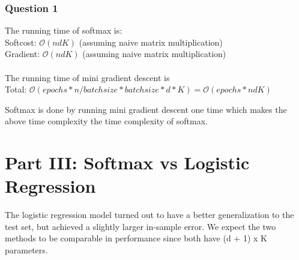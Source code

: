 \documentclass[paper=a4, fontsize=11pt]{scrartcl} %
\numberwithin{equation}{section} %
\numberwithin{figure}{section} %
\numberwithin{table}{section} %
\begin{document}
\subsubsection{Question 1}

The running time of softmax is: \\ 
Softcost: $\mathcal{O}(ndK)$ (assuming naive matrix multiplication) \\
Gradient: $\mathcal{O}(ndK)$ (assuming naive matrix multiplication) \\
\\
The running time of mini gradient descent is \\
Total: $\mathcal{O}(epochs * n/batchsize * batchsize * d * K) = \mathcal{O}(epochs * ndK)$

Softmax is done by running mini gradient descent one time which makes the above time complexity the time complexity of softmax.

\section{Part III: Softmax vs Logistic Regression}
The logistic regression model turned out to have a better generalization to the test set, but achieved a slightly larger in-sample error. We expect the two methods to be comparable in performance since both have (d + 1) x K parameters. 
\end{document}
